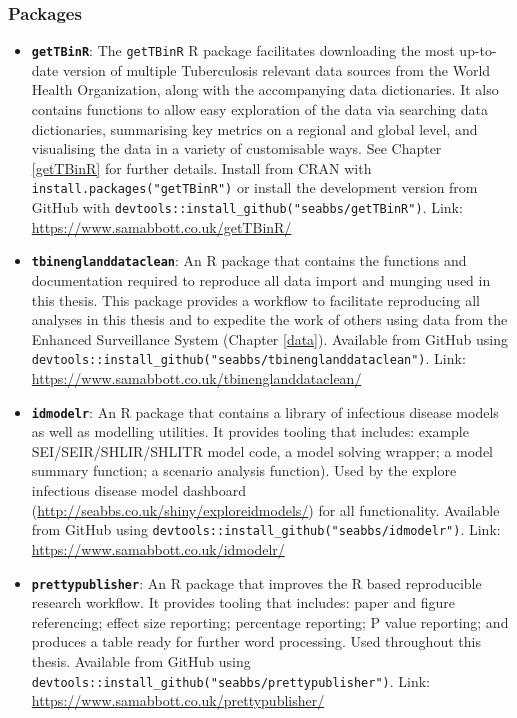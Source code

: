 \documentclass[11pt,twoside]{bristolthesis}
\begin{document}
  \hypertarget{packages}{%
  \subsubsection{Packages}\label{packages}}
  \begin{itemize}
  \item
    \textbf{\texttt{getTBinR}}: The \texttt{getTBinR} R package facilitates downloading the most up-to-date version of multiple Tuberculosis relevant data sources from the World Health Organization, along with the accompanying data dictionaries. It also contains functions to allow easy exploration of the data via searching data dictionaries, summarising key metrics on a regional and global level, and visualising the data in a variety of customisable ways. See Chapter \ref{getTBinR} for further details. Install from CRAN with \texttt{install.packages("getTBinR")} or install the development version from GitHub with \texttt{devtools::install\_github("seabbs/getTBinR")}. Link: \url{https://www.samabbott.co.uk/getTBinR/}
  \item
    \textbf{\texttt{tbinenglanddataclean}}: An R package that contains the functions and documentation required to reproduce all data import and munging used in this thesis. This package provides a workflow to facilitate reproducing all analyses in this thesis and to expedite the work of others using data from the Enhanced Surveillance System (Chapter \ref{data}). Available from GitHub using \texttt{devtools::install\_github("seabbs/tbinenglanddataclean")}. Link: \url{https://www.samabbott.co.uk/tbinenglanddataclean/}
  \item
    \textbf{\texttt{idmodelr}}: An R package that contains a library of infectious disease models as well as modelling utilities. It provides tooling that includes: example SEI/SEIR/SHLIR/SHLITR model code, a model solving wrapper; a model summary function; a scenario analysis function). Used by the explore infectious disease model dashboard (\url{http://seabbs.co.uk/shiny/exploreidmodels/}) for all functionality. Available from GitHub using \texttt{devtools::install\_github("seabbs/idmodelr")}. Link: \url{https://www.samabbott.co.uk/idmodelr/}
  \item
    \textbf{\texttt{prettypublisher}}: An R package that improves the R based reproducible research workflow. It provides tooling that includes: paper and figure referencing; effect size reporting; percentage reporting; P value reporting; and produces a table ready for further word processing. Used throughout this thesis. Available from GitHub using \texttt{devtools::install\_github("seabbs/prettypublisher")}. Link: \url{https://www.samabbott.co.uk/prettypublisher/}
  \end{itemize}
\end{document}
